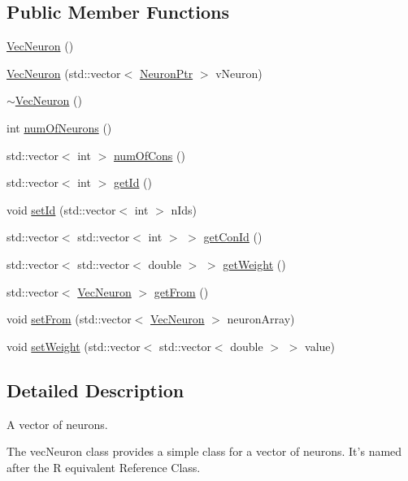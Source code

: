 \subsection*{Public Member Functions}
\begin{DoxyCompactItemize}
\item 
\hyperlink{class_vec_neuron_ae0bbf203eaef81c45facbee57b463b37}{VecNeuron} ()
\item 
\hyperlink{class_vec_neuron_ae7bc02590cd22902220fbcd7949be0e7}{VecNeuron} (std::vector$<$ \hyperlink{_a_m_o_r_e_8h_ac1ea936c2c7728eb382278131652fef4}{NeuronPtr} $>$ vNeuron)
\item 
\hyperlink{class_vec_neuron_a6bf0db759d6940f4e69e0da4a4c4ea98}{$\sim$VecNeuron} ()
\item 
int \hyperlink{class_vec_neuron_a3bade484bdea1bec20aa6bb0b977d259}{numOfNeurons} ()
\item 
std::vector$<$ int $>$ \hyperlink{class_vec_neuron_a70b0a6f571c1737a6a1d1f6c831fa585}{numOfCons} ()
\item 
std::vector$<$ int $>$ \hyperlink{class_vec_neuron_ab9cf35c1f6b087e0cabfe5294186397c}{getId} ()
\item 
void \hyperlink{class_vec_neuron_a552e694e9ec6a2bc6afc3dfa37ed1a46}{setId} (std::vector$<$ int $>$ nIds)
\item 
std::vector$<$ std::vector$<$ int $>$ $>$ \hyperlink{class_vec_neuron_a90a0279a43adde8619add1fc24f2be0d}{getConId} ()
\item 
std::vector$<$ std::vector$<$ double $>$ $>$ \hyperlink{class_vec_neuron_a7d8e5973473abd6395e6651d6a3cd72e}{getWeight} ()
\item 
std::vector$<$ \hyperlink{class_vec_neuron}{VecNeuron} $>$ \hyperlink{class_vec_neuron_a03fd78d7a064de1ce6509d19cd9d5b58}{getFrom} ()
\item 
void \hyperlink{class_vec_neuron_ab1b2fe596ccf959fa86dfd84844aa81a}{setFrom} (std::vector$<$ \hyperlink{class_vec_neuron}{VecNeuron} $>$ neuronArray)
\item 
void \hyperlink{class_vec_neuron_ad8a9e6c5a28170c1278a8612bfac706a}{setWeight} (std::vector$<$ std::vector$<$ double $>$ $>$ value)
\end{DoxyCompactItemize}


\subsection{Detailed Description}
A vector of neurons. 

The vecNeuron class provides a simple class for a vector of neurons. It's named after the R equivalent Reference Class. 


